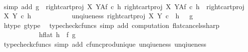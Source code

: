 \begin{isabellebody}
\ \ \ \ \ \ \ \ \ \ \ \isamarkupfalse%
\ {\isacharparenleft}{\kern0pt}simp\ add{\isacharcolon}{\kern0pt}\ {\isacartoucheopen}g\ {\isacharequal}{\kern0pt}\ right{\isacharunderscore}{\kern0pt}cart{\isacharunderscore}{\kern0pt}proj\ X\ Y\isactrlbsup A\isactrlesup \isactrlsub f\ {\isasymcirc}\isactrlsub c\ h\isactrlsup {\isasymflat}\isactrlsup {\isasymsharp}{\isacartoucheclose}\ {\isacartoucheopen}right{\isacharunderscore}{\kern0pt}cart{\isacharunderscore}{\kern0pt}proj\ X\ Y\isactrlbsup A\isactrlesup \isactrlsub f\ {\isasymcirc}\isactrlsub c\ h\isactrlsup {\isasymflat}\isactrlsup {\isasymsharp}\ {\isacharequal}{\kern0pt}\ {\isacharparenleft}{\kern0pt}right{\isacharunderscore}{\kern0pt}cart{\isacharunderscore}{\kern0pt}proj\ X\ Y\ {\isasymcirc}\isactrlsub c\ h\isactrlsup {\isasymflat}{\isacharparenright}{\kern0pt}\isactrlsup {\isasymsharp}{\isacartoucheclose}{\isacharparenright}{\kern0pt}\isanewline
\ \ \ \ \ \ \ \ \isamarkupfalse%
\ \isamarkupfalse%
\ unqiueness{}{\isacharcolon}{\kern0pt}\ {\isachardoublequoteopen}{\isacharparenleft}{\kern0pt}right{\isacharunderscore}{\kern0pt}cart{\isacharunderscore}{\kern0pt}proj\ X\ Y{\isacharparenright}{\kern0pt}\ {\isasymcirc}\isactrlsub c\ \ h\isactrlsup {\isasymflat}\ {\isacharequal}{\kern0pt}\ \ g\isactrlsup {\isasymflat}{\isachardoublequoteclose}\isanewline
\ \ \ \ \ \ \ \ \ \ \isamarkupfalse%
\ h{\isacharunderscore}{\kern0pt}type\ g{\isacharunderscore}{\kern0pt}type\ \isamarkupfalse%
\ {\isacharparenleft}{\kern0pt}typecheck{\isacharunderscore}{\kern0pt}cfuncs{\isacharcomma}{\kern0pt}\ simp\ add{\isacharcolon}{\kern0pt}\ computation{}\ flat{\isacharunderscore}{\kern0pt}cancels{\isacharunderscore}{\kern0pt}sharp{\isacharparenright}{\kern0pt}\isanewline
\ \ \ \ \ \ \ \ \isamarkupfalse%
\ \isamarkupfalse%
\ h{\isacharunderscore}{\kern0pt}flat{\isacharcolon}{\kern0pt}\ {\isachardoublequoteopen}h\isactrlsup {\isasymflat}\ {\isacharequal}{\kern0pt}\ {\isasymlangle}f\isactrlsup {\isasymflat}{\isacharcomma}{\kern0pt}\ g\isactrlsup {\isasymflat}{\isasymrangle}{\isachardoublequoteclose}\isanewline
\ \ \ \ \ \ \ \ \ \ \isamarkupfalse%
\ {\isacharparenleft}{\kern0pt}typecheck{\isacharunderscore}{\kern0pt}cfuncs{\isacharcomma}{\kern0pt}\ simp\ add{\isacharcolon}{\kern0pt}\ cfunc{\isacharunderscore}{\kern0pt}prod{\isacharunderscore}{\kern0pt}unique\ unqiueness{}\ unqiueness{}{\isacharparenright}{\kern0pt}\isanewline
\ \ \ \ \ \ \ \ \isamarkupfalse%

\end{isabellebody}
